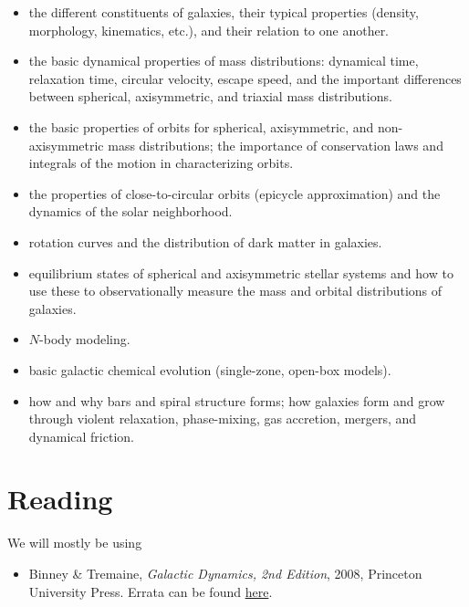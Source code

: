 \documentclass{article}
\begin{document}
\begin{itemize}

  \item the different constituents of galaxies, their typical
    properties (density, morphology, kinematics, etc.), and their
    relation to one another.

  \item the basic dynamical properties of mass distributions:
    dynamical time, relaxation time, circular velocity, escape speed,
    and the important differences between spherical, axisymmetric, and
    triaxial mass distributions.

  \item the basic properties of orbits for spherical, axisymmetric,
    and non-axisymmetric mass distributions; the importance of
    conservation laws and integrals of the motion in characterizing
    orbits.

  \item the properties of close-to-circular orbits (epicycle
    approximation) and the dynamics of the solar neighborhood.

  \item rotation curves and the distribution of dark matter in galaxies.

  \item equilibrium states of spherical and axisymmetric stellar
    systems and how to use these to observationally measure the mass and
    orbital distributions of galaxies.

  \item $N$-body modeling.

  \item basic galactic chemical evolution (single-zone, open-box
    models).

  \item how and why bars and spiral structure forms; how galaxies form
    and grow through violent relaxation, phase-mixing, gas accretion,
    mergers, and dynamical friction.

\end{itemize}

\section*{Reading}

We will mostly be using

\begin{itemize}

  \item Binney \& Tremaine, \emph{Galactic Dynamics, 2nd Edition},
    2008, Princeton University Press. Errata can be found
    \href{https://www-thphys.physics.ox.ac.uk/people/JamesBinney/web/index\_files/BT2errors.pdf}{here}.

\end{itemize}
\end{document}
